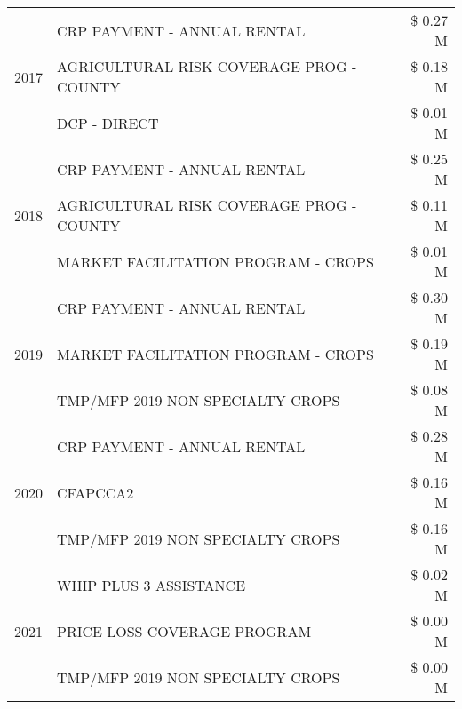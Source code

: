 \begin{tabular}{llr}
\cline{1-3}
\multirow[t]{3}{*}{2017} & CRP PAYMENT - ANNUAL RENTAL & \$ 0.27 M \\
 & AGRICULTURAL RISK COVERAGE PROG - COUNTY & \$ 0.18 M \\
 & DCP - DIRECT & \$ 0.01 M \\
\cline{1-3}
\multirow[t]{3}{*}{2018} & CRP PAYMENT - ANNUAL RENTAL & \$ 0.25 M \\
 & AGRICULTURAL RISK COVERAGE PROG - COUNTY & \$ 0.11 M \\
 & MARKET FACILITATION PROGRAM - CROPS & \$ 0.01 M \\
\cline{1-3}
\multirow[t]{3}{*}{2019} & CRP PAYMENT - ANNUAL RENTAL & \$ 0.30 M \\
 & MARKET FACILITATION PROGRAM - CROPS & \$ 0.19 M \\
 & TMP/MFP 2019 NON SPECIALTY CROPS & \$ 0.08 M \\
\cline{1-3}
\multirow[t]{3}{*}{2020} & CRP PAYMENT - ANNUAL RENTAL & \$ 0.28 M \\
 & CFAPCCA2 & \$ 0.16 M \\
 & TMP/MFP 2019 NON SPECIALTY CROPS & \$ 0.16 M \\
\cline{1-3}
\multirow[t]{3}{*}{2021} & WHIP PLUS 3 ASSISTANCE & \$ 0.02 M \\
 & PRICE LOSS COVERAGE PROGRAM & \$ 0.00 M \\
 & TMP/MFP 2019 NON SPECIALTY CROPS & \$ 0.00 M \\
\cline{1-3}
\bottomrule
\end{tabular}
